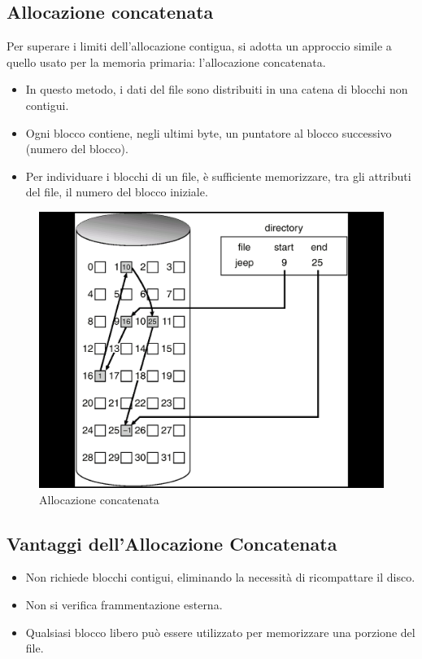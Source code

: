 \subsection{Allocazione concatenata}

Per superare i limiti dell'allocazione contigua, si adotta un approccio simile a quello usato per la memoria primaria: l'allocazione concatenata.

\begin{itemize}
    \item In questo metodo, i dati del file sono distribuiti in una catena di blocchi non contigui.
    \item Ogni blocco contiene, negli ultimi byte, un puntatore al blocco successivo (numero del blocco).
    \item Per individuare i blocchi di un file, è sufficiente memorizzare, tra gli attributi del file, il numero del blocco iniziale.
\end{itemize}


\begin{figure}[h] \centering \includegraphics[width=0.50\linewidth]{images/allocazione_concatenata.png} \caption{Allocazione concatenata} \end{figure}


\subsection{Vantaggi dell’Allocazione Concatenata}
\begin{itemize}
    \item Non richiede blocchi contigui, eliminando la necessità di ricompattare il disco.
    \item Non si verifica frammentazione esterna.
    \item Qualsiasi blocco libero può essere utilizzato per memorizzare una porzione del file.
\end{itemize}

